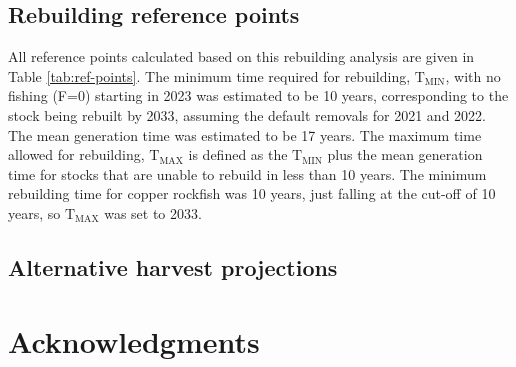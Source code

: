 \documentclass[11pt,
  english,
  a4paper,
]{article}
\begin{document}

\hypertarget{rebuilding-reference-points}{%
\subsection{Rebuilding reference points}\label{rebuilding-reference-points}}

\leavevmode\tagmcend\tagstructend


All reference points calculated based on this rebuilding analysis are given in Table \ref{tab:ref-points}. The minimum time required for rebuilding, {\(\text{T}_\text{MIN}\)\leavevmode\tagmcend\tagstructend}, with no fishing (F=0) starting in 2023 was estimated to be 10 years, corresponding to the stock being rebuilt by 2033, assuming the default removals for 2021 and 2022. The mean generation time was estimated to be 17 years. The maximum time allowed for rebuilding, {\(\text{T}_\text{MAX}\)\leavevmode\tagmcend\tagstructend} is defined as the {\(\text{T}_\text{MIN}\)\leavevmode\tagmcend\tagstructend} plus the mean generation time for stocks that are unable to rebuild in less than 10 years. The minimum rebuilding time for copper rockfish was 10 years, just falling at the cut-off of 10 years, so {\(\text{T}_\text{MAX}\)\leavevmode\tagmcend\tagstructend} was set to 2033.

\leavevmode\tagmcend\tagstructend\par


\hypertarget{alternative-harvest-projections}{%
\subsection{Alternative harvest projections}\label{alternative-harvest-projections}}

\leavevmode\tagmcend\tagstructend


\hypertarget{acknowledgments}{%
\section{Acknowledgments}\label{acknowledgments}}
\end{document}
